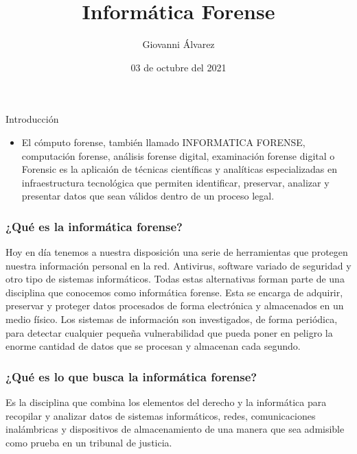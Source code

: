 \documentclass[12pt]{beamer}
\begin{document}
	\author{Giovanni Álvarez}
	\title{Informática Forense}
	\date{03 de octubre del 2021}
	
	\begin{frame}[plain]
		\maketitle
	\end{frame}

	
\begin{frame}{Introducción}
	\begin{itemize}
\item El cómputo forense, también llamado INFORMATICA FORENSE, computación forense, análisis forense digital, examinación forense digital o Forensic es la aplicaión de técnicas científicas y analíticas especializadas en infraestructura tecnológica que permiten identificar, preservar, analizar y presentar datos que sean válidos dentro de un proceso legal.
\end{itemize}
\end{frame}

\begin{frame}
\frametitle{¿Qué es la informática forense?}

Hoy en día tenemos a nuestra disposición una serie de herramientas que protegen nuestra información personal en la red. Antivirus, software variado de seguridad y otro tipo de sistemas informáticos. Todas estas alternativas forman parte de una disciplina que conocemos como informática forense. Esta se encarga de adquirir, preservar y proteger datos procesados de forma electrónica y almacenados en un medio físico. Los sistemas de información son investigados, de forma periódica, para detectar cualquier pequeña vulnerabilidad que pueda poner en peligro la enorme cantidad de datos que se procesan y almacenan cada segundo.
\end{frame}


\begin{frame}
\frametitle{¿Qué es lo que busca la informática forense?}

Es la disciplina que combina los elementos del derecho y la informática para recopilar y analizar datos de sistemas informáticos, redes, comunicaciones inalámbricas y dispositivos de almacenamiento de una manera que sea admisible como prueba en un tribunal de justicia.
\end{frame}
\end{document}
